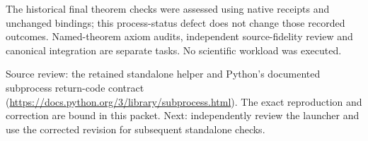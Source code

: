 \documentclass[10pt]{article}
\begin{document}
The historical final theorem checks were assessed using native receipts and unchanged bindings; this process-status defect does not change those recorded outcomes. Named-theorem axiom audits, independent source-fidelity review and canonical integration are separate tasks. No scientific workload was executed.

Source review: the retained standalone helper and Python's documented subprocess return-code contract (\url{https://docs.python.org/3/library/subprocess.html}). The exact reproduction and correction are bound in this packet. Next: independently review the launcher and use the corrected revision for subsequent standalone checks.
\end{document}
